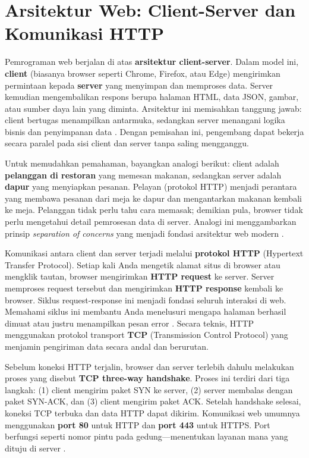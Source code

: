﻿\section{Arsitektur Web: Client-Server dan Komunikasi HTTP}
Pemrograman web berjalan di atas \textbf{arsitektur client-server}. Dalam model ini, \textbf{client} (biasanya browser seperti Chrome, Firefox, atau Edge) mengirimkan permintaan kepada \textbf{server} yang menyimpan dan memproses data. Server kemudian mengembalikan respons berupa halaman HTML, data JSON, gambar, atau sumber daya lain yang diminta. Arsitektur ini memisahkan tanggung jawab: client bertugas menampilkan antarmuka, sedangkan server menangani logika bisnis dan penyimpanan data \cite{mdnLearn}. Dengan pemisahan ini, pengembang dapat bekerja secara paralel pada sisi client dan server tanpa saling mengganggu.

Untuk memudahkan pemahaman, bayangkan analogi berikut: client adalah \textbf{pelanggan di restoran} yang memesan makanan, sedangkan server adalah \textbf{dapur} yang menyiapkan pesanan. Pelayan (protokol HTTP) menjadi perantara yang membawa pesanan dari meja ke dapur dan mengantarkan makanan kembali ke meja. Pelanggan tidak perlu tahu cara memasak; demikian pula, browser tidak perlu mengetahui detail pemrosesan data di server. Analogi ini menggambarkan prinsip \textit{separation of concerns} yang menjadi fondasi arsitektur web modern \cite{webdevLearn}.

Komunikasi antara client dan server terjadi melalui \textbf{protokol HTTP} (Hypertext Transfer Protocol). Setiap kali Anda mengetik alamat situs di browser atau mengklik tautan, browser mengirimkan \textbf{HTTP request} ke server. Server memproses request tersebut dan mengirimkan \textbf{HTTP response} kembali ke browser. Siklus request-response ini menjadi fondasi seluruh interaksi di web. Memahami siklus ini membantu Anda menelusuri mengapa halaman berhasil dimuat atau justru menampilkan pesan error \cite{webdevLearn}. Secara teknis, HTTP menggunakan protokol transport \textbf{TCP} (Transmission Control Protocol) yang menjamin pengiriman data secara andal dan berurutan.

Sebelum koneksi HTTP terjalin, browser dan server terlebih dahulu melakukan proses yang disebut \textbf{TCP three-way handshake}. Proses ini terdiri dari tiga langkah: (1) client mengirim paket SYN ke server, (2) server membalas dengan paket SYN-ACK, dan (3) client mengirim paket ACK. Setelah handshake selesai, koneksi TCP terbuka dan data HTTP dapat dikirim. Komunikasi web umumnya menggunakan \textbf{port 80} untuk HTTP dan \textbf{port 443} untuk HTTPS. Port berfungsi seperti nomor pintu pada gedung---menentukan layanan mana yang dituju di server \cite{mdnLearn}.

